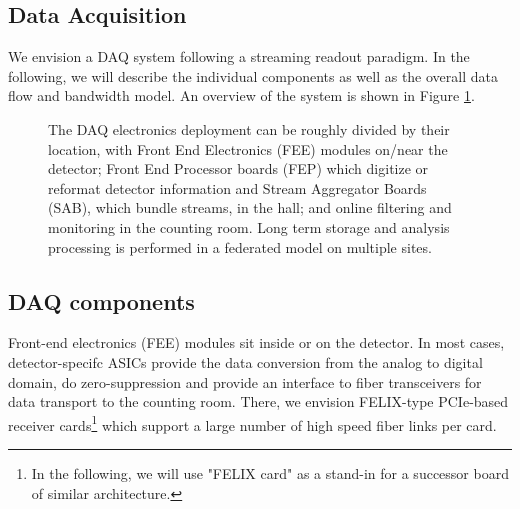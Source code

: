 \label{sec:online}

\subsection{Data Acquisition}

We envision a DAQ system following a streaming readout paradigm. In the following, we will describe the individual components as well as the overall data flow and bandwidth model. An overview of the system is shown in Figure \ref{fig:data_acquisition_diagram}.


\begin{figure}[hbt!]
 \begin{center}
  
  
  \caption[Data Acquisition Diagram]{\label{fig:data_acquisition_diagram} The DAQ electronics deployment can be roughly divided by their location, with Front End Electronics (FEE) modules on/near the detector; Front End Processor boards (FEP) which digitize or reformat detector information and Stream Aggregator Boards (SAB), which bundle streams, in the hall; and online filtering and monitoring in the counting room. Long term storage and analysis processing is performed in a federated model on multiple sites. }
 \end{center}
\end{figure}


\subsection{DAQ components}
 Front-end electronics (FEE) modules sit inside or on the detector. In most cases, detector-specifc ASICs provide the data conversion from the analog to digital domain, do zero-suppression and provide an interface to fiber transceivers for data transport to the counting room.  There, we envision FELIX-type PCIe-based receiver cards\footnote{In the following, we will use "FELIX card" as a stand-in for a successor board of similar architecture.} which support a large number of high speed fiber links per card.  

